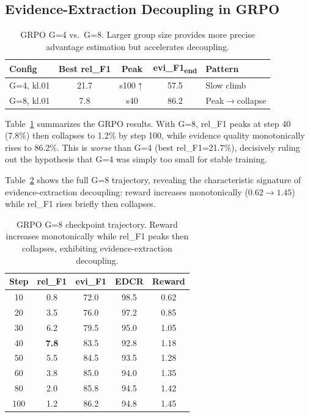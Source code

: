 \documentclass[11pt]{article}
\begin{document}
\subsection{Evidence-Extraction Decoupling in GRPO}

\begin{table}[t]
\centering
\small
\begin{tabular}{lcccl}
\toprule
\textbf{Config} & \textbf{Best rel\_F1} & \textbf{Peak} & \textbf{evi\_F1\textsubscript{end}} & \textbf{Pattern} \\
\midrule
G=4, kl.01 & 21.7 & s100$\uparrow$ & 57.5 & Slow climb \\
G=8, kl.01 & 7.8 & s40 & 86.2 & Peak$\to$collapse \\
\bottomrule
\end{tabular}
\caption{GRPO G=4 vs.\ G=8. Larger group size provides more precise advantage estimation but accelerates decoupling.}
\label{tab:grpo_summary}
\end{table}

Table~\ref{tab:grpo_summary} summarizes the GRPO results. With G=8, rel\_F1 peaks at step 40 (7.8\%) then collapses to 1.2\% by step 100, while evidence quality monotonically rises to 86.2\%. This is \emph{worse} than G=4 (best rel\_F1=21.7\%), decisively ruling out the hypothesis that G=4 was simply too small for stable training.

Table~\ref{tab:grpo_trajectory} shows the full G=8 trajectory, revealing the characteristic signature of evidence-extraction decoupling: reward increases monotonically ($0.62 \to 1.45$) while rel\_F1 rises briefly then collapses.

\begin{table}[t]
\centering
\small
\begin{tabular}{ccccc}
\toprule
\textbf{Step} & \textbf{rel\_F1} & \textbf{evi\_F1} & \textbf{EDCR} & \textbf{Reward} \\
\midrule
10 & 0.8 & 72.0 & 98.5 & 0.62 \\
20 & 3.5 & 76.0 & 97.2 & 0.85 \\
30 & 6.2 & 79.5 & 95.0 & 1.05 \\
40 & \textbf{7.8} & 83.5 & 92.8 & 1.18 \\
50 & 5.5 & 84.5 & 93.5 & 1.28 \\
60 & 3.8 & 85.0 & 94.0 & 1.35 \\
80 & 2.0 & 85.8 & 94.5 & 1.42 \\
100 & 1.2 & 86.2 & 94.8 & 1.45 \\
\bottomrule
\end{tabular}
\caption{GRPO G=8 checkpoint trajectory. Reward increases monotonically while rel\_F1 peaks then collapses, exhibiting evidence-extraction decoupling.}
\label{tab:grpo_trajectory}
\end{table}
\end{document}
